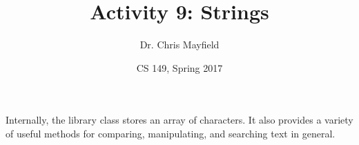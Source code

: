 \documentclass[12pt]{article}
\title{Activity 9: Strings}
\author{Dr. Chris Mayfield}
\date{CS 149, Spring 2017}
\begin{document}
\maketitle

Internally, the library class  stores an array of characters.
It also provides a variety of useful methods for comparing, manipulating, and searching text in general.



%
\end{document}
